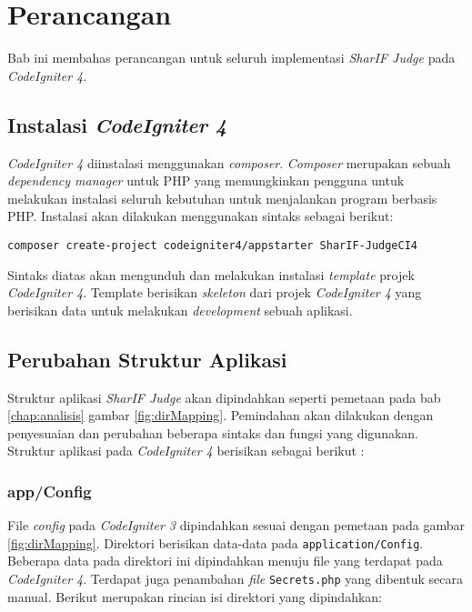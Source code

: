 \chapter{Perancangan}
\label{chap:perancangan}
Bab ini membahas perancangan untuk seluruh implementasi \textit{SharIF Judge} pada \textit{CodeIgniter 4}.

\section{Instalasi \textit{CodeIgniter 4}}
\textit{CodeIgniter 4} diinstalasi menggunakan \textit{composer}. \textit{Composer} merupakan sebuah \textit{dependency manager} untuk PHP yang memungkinkan pengguna untuk melakukan instalasi seluruh kebutuhan untuk menjalankan program berbasis PHP. Instalasi akan dilakukan menggunakan sintaks sebagai berikut:

\begin{center}
\verb|composer create-project codeigniter4/appstarter SharIF-JudgeCI4|
\end{center}

Sintaks diatas akan mengunduh dan melakukan instalasi \textit{template} projek \textit{CodeIgniter 4}. Template berisikan \textit{skeleton} dari projek \textit{CodeIgniter 4} yang berisikan data untuk melakukan \textit{development} sebuah aplikasi.

\section{Perubahan Struktur Aplikasi}
\label{sec:perubahanStruktur}
Struktur aplikasi \textit{SharIF Judge} akan dipindahkan seperti pemetaan pada bab \ref{chap:analisis} gambar \ref{fig:dirMapping}. Pemindahan akan dilakukan dengan penyesuaian dan perubahan beberapa sintaks dan fungsi yang digunakan.
\\
Struktur aplikasi pada \textit{CodeIgniter 4} berisikan sebagai berikut :
\subsection{app/Config}
File \textit{config} pada \textit{CodeIgniter 3} dipindahkan sesuai dengan pemetaan pada gambar \ref{fig:dirMapping}. Direktori berisikan data-data pada \texttt{application/Config}. Beberapa data pada direktori ini dipindahkan menuju file yang terdapat pada \textit{CodeIgniter 4}. Terdapat juga penambahan \textit{file} \texttt{Secrets.php} yang dibentuk secara manual. Berikut merupakan rincian isi direktori yang dipindahkan:
